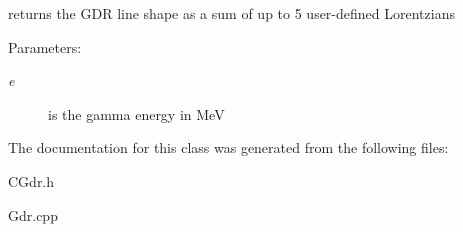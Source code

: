 returns the GDR line shape as a sum of up to 5 user-defined Lorentzians \begin{Desc}
\item[Parameters:]
\begin{description}
\item[{\em e}]is the gamma energy in Me\-V \end{description}
\end{Desc}


The documentation for this class was generated from the following files:\begin{CompactItemize}
\item 
CGdr.h\item 
Gdr.cpp\end{CompactItemize}
